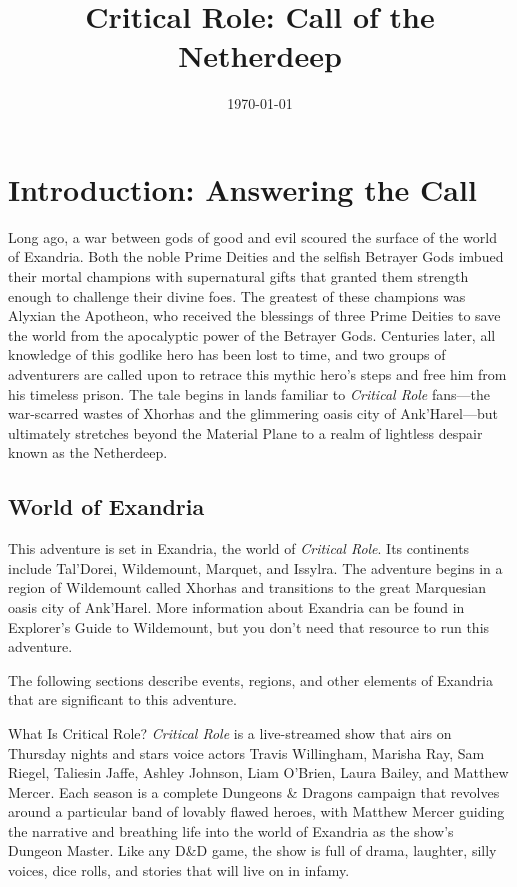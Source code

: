 \documentclass[letterpaper, 11pt, bg=full, twocolumn]{dndbook}
\title{Critical Role: Call of the Netherdeep}
\date{\today}
\begin{document}
\frontmatter

\maketitle
\thispagestyle{empty}
\clearpage

\tableofcontents
\clearpage

\mainmatter

\chapter{Introduction: Answering the Call}\label{ch:introduction-answering-the-call-1-1}

Long ago, a war between gods of good and evil scoured the surface of the world of Exandria. Both the noble Prime Deities and the selfish Betrayer Gods imbued their mortal champions with supernatural gifts that granted them strength enough to challenge their divine foes. The greatest of these champions was Alyxian the Apotheon, who received the blessings of three Prime Deities to save the world from the apocalyptic power of the Betrayer Gods.
Centuries later, all knowledge of this godlike hero has been lost to time, and two groups of adventurers are called upon to retrace this mythic hero's steps and free him from his timeless prison. The tale begins in lands familiar to \textit{Critical Role} fans---the war-scarred wastes of Xhorhas and the glimmering oasis city of Ank'Harel---but ultimately stretches beyond the Material Plane to a realm of lightless despair known as the Netherdeep.
\section{World of Exandria}

This adventure is set in Exandria, the world of \textit{Critical Role}. Its continents include Tal'Dorei, Wildemount, Marquet, and Issylra. The adventure begins in a region of Wildemount called Xhorhas and transitions to the great Marquesian oasis city of Ank'Harel. More information about Exandria can be found in Explorer's Guide to Wildemount, but you don't need that resource to run this adventure.

The following sections describe events, regions, and other elements of Exandria that are significant to this adventure.

\begin{DndSidebar}{What Is Critical Role?}
\textit{Critical Role} is a live-streamed show that airs on Thursday nights and stars voice actors Travis Willingham, Marisha Ray, Sam Riegel, Taliesin Jaffe, Ashley Johnson, Liam O'Brien, Laura Bailey, and Matthew Mercer. Each season is a complete Dungeons \& Dragons campaign that revolves around a particular band of lovably flawed heroes, with Matthew Mercer guiding the narrative and breathing life into the world of Exandria as the show's Dungeon Master. Like any D\&D game, the show is full of drama, laughter, silly voices, dice rolls, and stories that will live on in infamy.
\end{DndSidebar}
\end{document}
